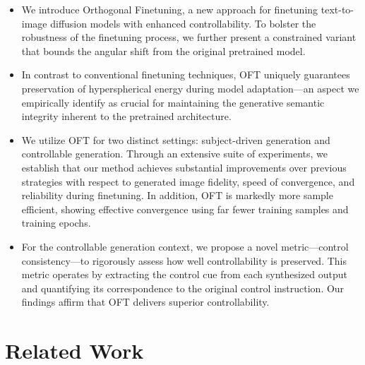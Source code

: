 \begin{itemize}[leftmargin=*,nosep]

    \item We introduce Orthogonal Finetuning, a new approach for finetuning text-to-image diffusion models with enhanced controllability. To bolster the robustness of the finetuning process, we further present a constrained variant that bounds the angular shift from the original pretrained model.
    \item In contrast to conventional finetuning techniques, OFT uniquely guarantees preservation of hyperspherical energy during model adaptation—an aspect we empirically identify as crucial for maintaining the generative semantic integrity inherent to the pretrained architecture.
    \item We utilize OFT for two distinct settings: subject-driven generation and controllable generation. Through an extensive suite of experiments, we establish that our method achieves substantial improvements over previous strategies with respect to generated image fidelity, speed of convergence, and reliability during finetuning. In addition, OFT is markedly more sample efficient, showing effective convergence using far fewer training samples and training epochs.
    \item For the controllable generation context, we propose a novel metric—control consistency—to rigorously assess how well controllability is preserved. This metric operates by extracting the control cue from each synthesized output and quantifying its correspondence to the original control instruction. Our findings affirm that OFT delivers superior controllability.
\end{itemize}

\section{Related Work}

